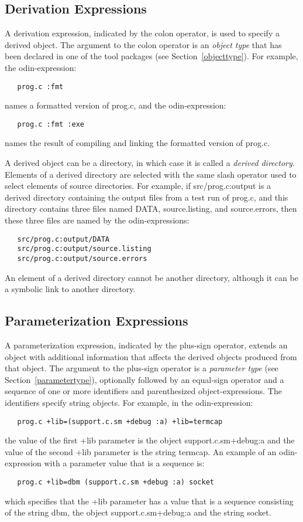 \subsection{Derivation Expressions}

A derivation expression, indicated by the colon operator,
is used to specify a derived object.
The argument to the colon operator is an {\em object type}
that has been declared in one of the tool packages
(see Section~\ref{objecttype}).
For example, the odin-expression:
\begin{verbatim}
   prog.c :fmt
\end{verbatim}
names a formatted version of {\ex prog.c}, and the odin-expression:
\begin{verbatim}
   prog.c :fmt :exe
\end{verbatim} 
names the result of compiling and linking
the formatted version of {\ex prog.c}.

A derived object can be a directory,
in which case it is called a {\em derived directory}.
Elements of a derived directory are selected with the
same slash operator used to select elements of source directories.
For example, if {\ex src/prog.c:output} is a derived directory
containing the output files from a test run of {\ex prog.c},
and this directory contains three files named
{\ex DATA}, {\ex source.listing}, and {\ex source.errors},
then these three files are named by the odin-expressions:
\begin{verbatim}
   src/prog.c:output/DATA
   src/prog.c:output/source.listing
   src/prog.c:output/source.errors
\end{verbatim}
An element of a derived directory cannot be another directory,
although it can be a symbolic link to another directory.

\subsection{Parameterization Expressions}

A parameterization expression, indicated by the plus-sign operator,
extends an object with additional information
that affects the derived objects produced from that object.
The argument to the plus-sign operator is a {\em parameter type}
(see Section~\ref{parametertype}),
optionally followed by an equal-sign operator and a sequence of 
one or more identifiers and parenthesized object-expressions.
The identifiers specify string objects.
For example, in the odin-expression:
\begin{verbatim}
   prog.c +lib=(support.c.sm +debug :a) +lib=termcap
\end{verbatim}
the value of the first {\ex +lib} parameter
is the object {\ex support.c.sm+debug:a}
and the value of the second {\ex +lib} parameter
is the string {\ex termcap}.
An example of an odin-expression with a parameter value that is a sequence is:
\begin{verbatim}
   prog.c +lib=dbm (support.c.sm +debug :a) socket
\end{verbatim}
which specifies that the {\ex +lib} parameter has a value that is
a sequence consisting of the string {\ex dbm},
the object {\ex support.c.sm+debug:a} and the string {\ex socket}.

